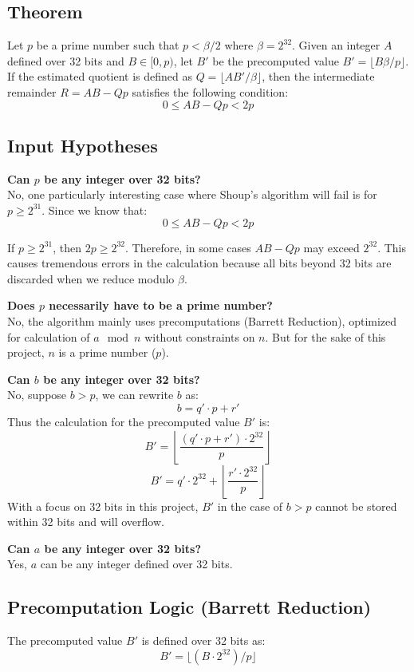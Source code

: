 \documentclass{article}
\begin{document}
\subsection{Theorem}
Let $p$ be a prime number such that $p < \beta/2$ where $\beta = 2^{32}$. Given an integer $A$ defined over 32 bits and
$B \in [0, p)$, let $B'$ be the precomputed value $B' = \lfloor B\beta/p \rfloor$.
If the estimated quotient is defined as $Q = \lfloor AB'/\beta \rfloor$, then the intermediate remainder $R = AB - Qp$ satisfies the following condition:
$$0 \le AB - Qp < 2p$$


\subsection{Input Hypotheses}
\textbf{Can $p$ be any integer over 32 bits?} \\
No, one particularly interesting case where Shoup's algorithm will fail is for $p \ge 2^{31}$.
Since we know that:
$$0 \le AB - Qp < 2p$$

If $p \ge 2^{31}$, then $2p \ge 2^{32}$. Therefore, in some cases $AB - Qp$ may exceed $2^{32}$. This causes tremendous errors in the calculation because
all bits beyond 32 bits are discarded when we reduce modulo $\beta$.

\textbf{Does $p$ necessarily have to be a prime number?} \\
No, the algorithm mainly uses precomputations (Barrett Reduction), optimized for calculation of $a \mod n$ without constraints on $n$.
But for the sake of this project, $n$ is a prime number ($p$).

\textbf{Can $b$ be any integer over 32 bits?} \\
No, suppose $ b > p $, we can rewrite $b$ as:
\[b = q'\cdot p + r'\]
Thus the calculation for the precomputed value $B'$ is:
\[B' = \left\lfloor\frac{(q' \cdot p + r')\cdot 2^{32}}{p}\right\rfloor\]
\[B' = q' \cdot 2^{32} + \left\lfloor\frac{r'\cdot 2^{32}}{p}\right\rfloor\]
With a focus on 32 bits in this project, $B'$ in the case of $b>p$ cannot be stored within 32 bits and will overflow.

\textbf{Can $a$ be any integer over 32 bits?} \\
Yes, $a$ can be any integer defined over 32 bits.

\newpage
\subsection{Precomputation Logic (Barrett Reduction)}
The precomputed value $B'$ is defined over 32 bits as:
\[B'= \lfloor (B \cdot 2^{32}) / p \rfloor \]
\end{document}
